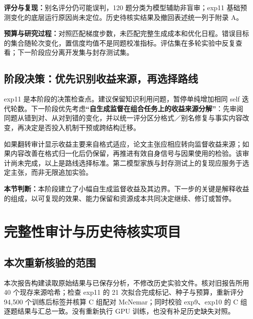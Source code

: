 \documentclass[11pt,a4paper]{article}
\newcommand{\takeaway}[1]{\par\noindent\colorbox{light}{\parbox{\dimexpr\linewidth-2\fboxsep\relax}{\small\textbf{本节判断：}#1}}\par}
\begin{document}
\textbf{评分与复现：}别名评分仍可能误判，120 题分类为模型辅助非盲审；exp11 基础预测变化的底层运行原因尚未定位。历史待核实结果及撤回表述统一列于附录 A。

\textbf{预算与研究过程：}对照匹配梯度步数，未匹配完整生成成本和优化日程。错误目标的集合随轮次变化，置信度均值不是同题校准指标。评估集在多轮实验中反复查看；下一阶段应分离开发集与封存测试集。
\subsection{阶段决策：优先识别收益来源，再选择路线}
exp11 是本阶段的决策检查点。建议保留知识利用问题，暂停单纯增加相同 self 迭代轮数。下一阶段优先考虑\textbf{“自生成监督在组合任务上的收益来源分解”}：先审阅同题从错到对、从对到错的变化，并以统一评分区分格式／别名修复与事实内容改变，再决定是否投入机制干预或跨结构迁移。

如果翻转审计显示收益主要来自格式适应，论文主张应相应转向监督收益来源；如果内容改善在格式归一化后仍保留，再推进有效自身信号与因果使用的检验。该审计尚未完成，以上是路线选择标准。第二模型家族与封存测试上的复现应服务于选定主张，而非无限追加实验。
\takeaway{本阶段建立了小幅自生成监督收益及其边界。下一步的关键是解释收益的组成，以可复现的效果、能力保留和资源成本共同决定继续、修订或暂停。}
\clearpage
\appendix
\section{完整性审计与历史待核实项目}
\subsection{本次重新核验的范围}
本次报告构建读取原始结果与已保存分析，不修改历史实验文件。核对旧报告所用 40 个现存来源哈希；检查 exp11 的 21 次拟合完成标记、种子与预算，重新评分 94,500 个训练后标签并核算 C 组配对 McNemar；同时校验 exp9、exp10 的 C 组逐题结果与汇总一致。没有重新执行 GPU 训练，也没有补足历史缺失对照。
\end{document}
